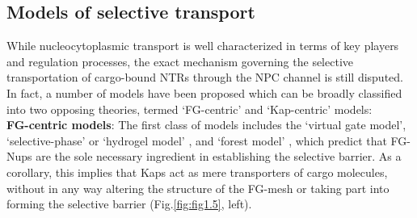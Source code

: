 \subsection{Models of selective transport }
While nucleocytoplasmic transport is well characterized in terms of key players and regulation processes, the exact mechanism governing the selective transportation of cargo-bound NTRs through the NPC channel is still disputed. In fact, a number of models have been proposed which can be broadly classified into two opposing theories, termed ‘FG-centric’ and ‘Kap-centric’ models:\\[0.3pt]

\noindent\textbf{FG-centric models}: The first class of models includes the ‘virtual gate model’\cite{Rout2003}, ‘selective-phase’ or ‘hydrogel model’ \cite{Frey2006,Frey2007}, and ‘forest model’ \cite{Yamada2010}, which predict that FG-Nups are the sole necessary ingredient in establishing the selective barrier. As a corollary, this implies that Kaps act as mere transporters of cargo molecules, without in any way altering the structure of the FG-mesh or taking part into forming the selective barrier (Fig.\ref{fig:fig1.5}, left).

